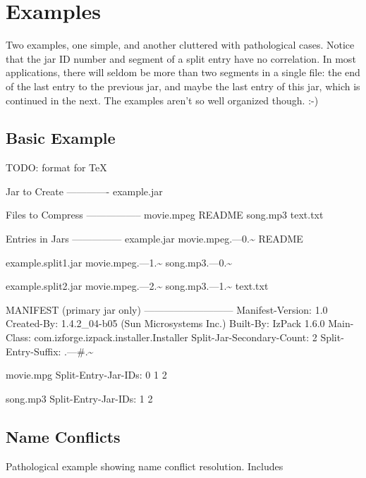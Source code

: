 \documentclass[a4paper, 12pt, pdftex]{report}
\begin{document}
\section{Examples}

Two examples, one simple, and another cluttered with pathological
cases. Notice that the jar ID number and segment of a split entry have
no correlation. In most applications, there will seldom be more than
two segments in a single file: the end of the last entry to the
previous jar, and maybe the last entry of this jar, which is continued
in the next. The examples aren't so well organized though. :-)

\subsection{Basic Example}

TODO: format for TeX

Jar to Create
-------------
    example.jar

Files to Compress
-----------------
    movie.mpeg
    README
    song.mp3
    text.txt

Entries in Jars
---------------
    example.jar           movie.mpeg.---0.\~{}
                          README
    
    example.split1.jar    movie.mpeg.---1.\~{}
                          song.mp3.---0.\~{}
    
    example.split2.jar    movie.mpeg.---2.\~{}
                          song.mp3.---1.\~{}
                          text.txt

MANIFEST (primary jar only)
---------------------------
    Manifest-Version: 1.0
    Created-By: 1.4.2\_04-b05 (Sun Microsystems Inc.)
    Built-By: IzPack 1.6.0
    Main-Class: com.izforge.izpack.installer.Installer
    Split-Jar-Secondary-Count: 2
    Split-Entry-Suffix: .---\#.\~{}
    
    movie.mpg
    Split-Entry-Jar-IDs: 0 1 2
    
    song.mp3
    Split-Entry-Jar-IDs: 1 2

\subsection{Name Conflicts}

Pathological example showing name conflict resolution.  Includes
\end{document}
